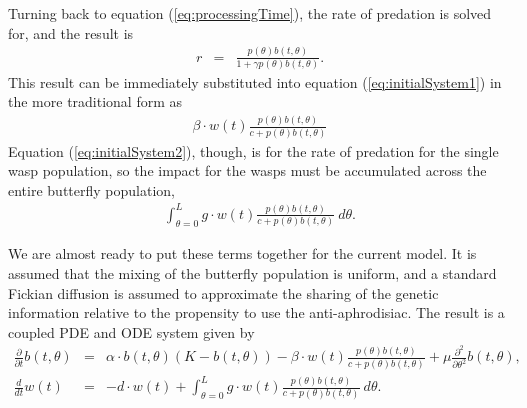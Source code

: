 \documentclass[12pt]{article}
\begin{document}
Turning back to equation (\ref{eq:processingTime}), the rate of
predation is solved for, and the result is
\begin{eqnarray}
  \label{eq:rateOfPredation}
  r & = &  \frac{p(\theta) b(t,\theta) }{1 + \gamma p(\theta) b(t,\theta)}.
\end{eqnarray}
This result can be immediately substituted into equation
(\ref{eq:initialSystem1}) in the more traditional form as
\begin{eqnarray}
  \label{eq:butterflyPredationRate}
  \beta \cdot w(t) \frac{p(\theta) b(t,\theta) }{c +  p(\theta) b(t,\theta)}
\end{eqnarray}
Equation (\ref{eq:initialSystem2}), though, is for the rate of predation
for the single wasp population, so the impact for the wasps must be
accumulated across the entire butterfly population,
\begin{eqnarray}
  \label{eq:waspPredationRate}
  \int^L_{\theta=0} g \cdot w(t) \frac{p(\theta) b(t,\theta) }{c + p(\theta) b(t,\theta)} ~ d\theta.
\end{eqnarray}

We are almost ready to put these terms together for the current
model. It is assumed that the mixing of the butterfly population is
uniform, and a standard Fickian diffusion is assumed to approximate
the sharing of the genetic information relative to the propensity to
use the anti-aphrodisiac. The result is a coupled PDE and ODE system
given by 
\begin{eqnarray}
  \label{eq:odePDE1}
  \frac{\partial}{\partial t} b(t,\theta) & = &
      \alpha \cdot b(t,\theta) (K - b(t,\theta))
      - \beta \cdot w(t) \frac{p(\theta) b(t,\theta)}{c+p(\theta)b(t,\theta)}
      + \mu \frac{\partial^2}{\partial \theta^2} b(t,\theta) , \\
  \label{eq:odePDE2}
  \frac{d}{dt} w(t) & = & -d \cdot w(t) +
      \int^L_{\theta=0} g \cdot w(t) \frac{p(\theta) b(t,\theta) }{c + p(\theta) b(t,\theta)} ~ d\theta.
\end{eqnarray}
\end{document}
